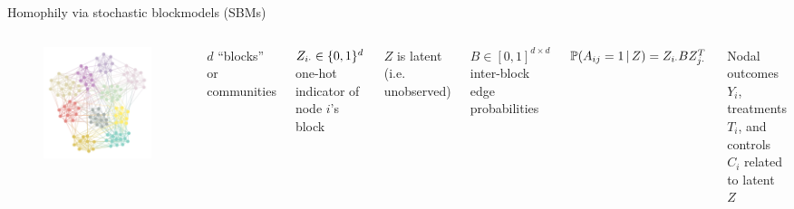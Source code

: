 \documentclass{beamer}
\theoremstyle{remark}
\begin{document}
\begin{frame}{Homophily via stochastic blockmodels (SBMs)}

    \begin{columns}

        \begin{figure}
            \includegraphics[width=\textwidth]{figures/assortative.png}
        \end{figure}


        $d$ ``blocks'' or communities

        $Z_{i \cdot} \in \{0, 1\}^d$ one-hot indicator of node $i$'s block

        \vspace{4mm}

        $Z$ is latent (i.e. unobserved)

        \vspace{4mm}

        $B \in [0, 1]^{d \times d}$ inter-block edge probabilities

        $\P[Z]{A_{ij} = 1} = Z_{i \cdot} B Z_{j \cdot}^T$

        \vspace{4mm}

        Nodal outcomes $Y_i$, treatments $T_i$, and controls $C_i$ related to latent $Z$

    \end{columns}

\end{frame}
\end{document}
